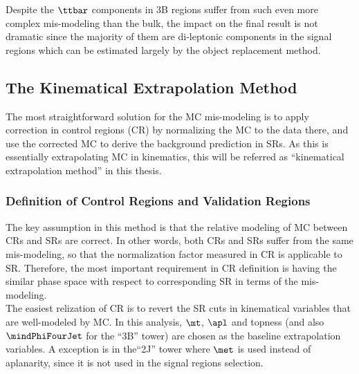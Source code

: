 Despite the $\ttbar$ components in 3B regions suffer from such even more complex mis-modeling than the bulk, the impact on the final result is not dramatic since the majority of them are di-leptonic components in the signal regions which can be estimated largely by the object replacement method.




\clearpage


%
%


\subsection{The Kinematical Extrapolation Method} \label{sec::BGestimation::kineExtp}
The most straightforward solution for the MC mis-modeling is to apply correction in control regions (CR) by normalizing the MC to the data there, and use the corrected MC to derive the background prediction in SRs. As this is essentially extrapolating MC in kinematics, this will be referred as ``kinematical extrapolation method'' in this thesis. \\ 

\subsubsection{Definition of Control Regions and Validation Regions}
The key assumption in this method is that the relative modeling of MC between CRs and SRs are correct. In other words, both CRs and SRs suffer from the same mis-modeling, so that the normalization factor measured in CR is applicable to SR. Therefore, the most important requirement in CR definition is having the similar phase space with respect to corresponding SR in terms of the mis-modeling. \\

The easiest relization of CR is to revert the SR cuts in kinematical variables that are well-modeled by MC. In this analysis, $\mt$, $\apl$ and topness (and also $\mindPhiFourJet$ for the ``3B'' tower) are chosen as the baseline extrapolation variables. 
A exception is in the``2J'' tower where $\met$ is used instead of aplanarity, since it is not used in the signal regions selection.

